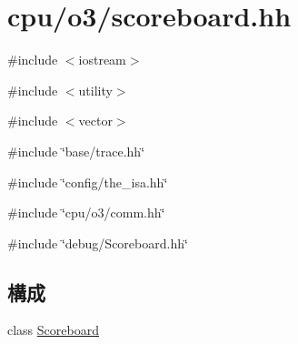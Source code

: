 \hypertarget{scoreboard_8hh}{
\section{cpu/o3/scoreboard.hh}
\label{scoreboard_8hh}
}
{\ttfamily \#include $<$iostream$>$}\par
{\ttfamily \#include $<$utility$>$}\par
{\ttfamily \#include $<$vector$>$}\par
{\ttfamily \#include \char`\"{}base/trace.hh\char`\"{}}\par
{\ttfamily \#include \char`\"{}config/the\_\-isa.hh\char`\"{}}\par
{\ttfamily \#include \char`\"{}cpu/o3/comm.hh\char`\"{}}\par
{\ttfamily \#include \char`\"{}debug/Scoreboard.hh\char`\"{}}\par
\subsection*{構成}
\begin{DoxyCompactItemize}
\item 
class \hyperlink{classScoreboard}{Scoreboard}
\end{DoxyCompactItemize}

